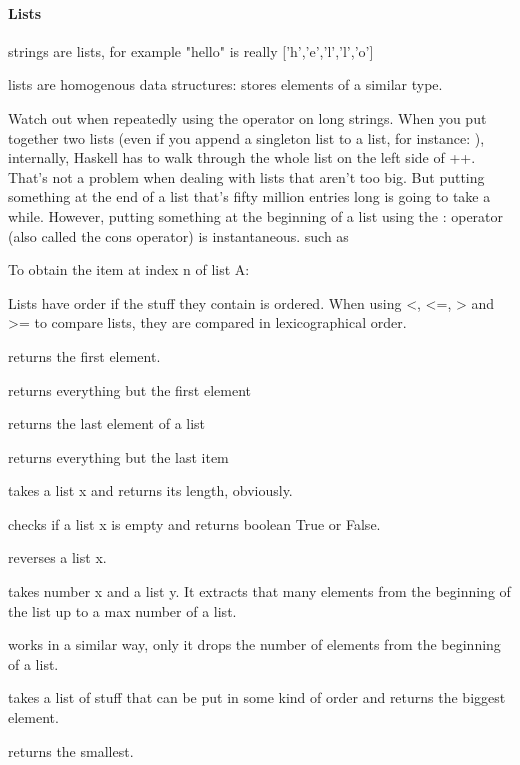 \paragraph{Lists}
\begin{compactitem}
\item strings are lists, for example "hello" is really ['h','e','l','l','o']
\item lists are homogenous data structures: stores elements of a similar type.
\item Watch out when repeatedly using the \e{++} operator on long strings. When you put together two lists (even if you append a singleton list to a list, for instance: \e{[1,2,3] ++ [4]}), internally, Haskell has to walk through the whole list on the left side of ++. That's not a problem when dealing with lists that aren't too big. But putting something at the end of a list that's fifty million entries long is going to take a while. However, putting something at the beginning of a list using the : operator (also called the cons operator) is instantaneous.
such as 
\item To obtain the item at index n of list A: 
\item Lists have order if the stuff they contain is ordered. When using <, <=, > and >= to compare lists, they are compared in lexicographical order. 
\item {} returns the first element.
\item {} returns everything but the first element
\item {} returns the last element of a list
\item {} returns everything but the last item
\item {} takes a list x and returns its length, obviously.
\item {} checks if a list x is empty and returns boolean True or False. 
\item {} reverses a list x.
\item {} takes number x and a list y. It extracts that many elements from the beginning of the list up to a max number of a list.
\item {} works in a similar way, only it drops the number of elements from the beginning of a list.
\item {} takes a list of stuff that can be put in some kind of order and returns the biggest element.
\item {} returns the smallest.

\end{compactitem}
